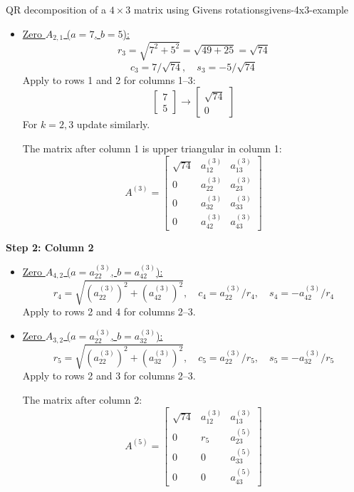 \begin{example}{QR decomposition of a $4\times3$ matrix using Givens rotations}{givens-4x3-example}
\begin{itemize}
        \item \underline{Zero $A_{2,1}$ ($a=7$, $b=5$):}
        \[
            r_3 = \sqrt{7^2 + 5^2} = \sqrt{49 + 25} = \sqrt{74}
        \]
        \[
            c_3 = 7/\sqrt{74}, \quad s_3 = -5/\sqrt{74}
        \]
        Apply to rows 1 and 2 for columns 1--3:
        \[
            \begin{bmatrix}
                7 \\
                5
            \end{bmatrix}
            \to
            \begin{bmatrix}
                \sqrt{74} \\
                0
            \end{bmatrix}
        \]
        For $k=2,3$ update similarly.

        The matrix after column 1 is upper triangular in column 1:
        \[
            A^{(3)} = \begin{bmatrix}
                \sqrt{74} & a_{12}^{(3)} & a_{13}^{(3)} \\
                0 & a_{22}^{(3)} & a_{23}^{(3)} \\
                0 & a_{32}^{(3)} & a_{33}^{(3)} \\
                0 & a_{42}^{(3)} & a_{43}^{(3)}
            \end{bmatrix}
        \]
    \end{itemize}

    \textbf{Step 2: Column 2}

    \begin{itemize}
        \item \underline{Zero $A_{4,2}$ ($a=a_{22}^{(3)}$, $b=a_{42}^{(3)}$):}
        \[
            r_4 = \sqrt{(a_{22}^{(3)})^2 + (a_{42}^{(3)})^2}, \quad c_4 = a_{22}^{(3)}/r_4, \quad s_4 = -a_{42}^{(3)}/r_4
        \]
        Apply to rows 2 and 4 for columns 2--3.

        \item \underline{Zero $A_{3,2}$ ($a=a_{22}^{(3)}$, $b=a_{32}^{(3)}$):}
        \[
            r_5 = \sqrt{(a_{22}^{(3)})^2 + (a_{32}^{(3)})^2}, \quad c_5 = a_{22}^{(3)}/r_5, \quad s_5 = -a_{32}^{(3)}/r_5
        \]
        Apply to rows 2 and 3 for columns 2--3.

        The matrix after column 2:
        \[
            A^{(5)} = \begin{bmatrix}
                \sqrt{74} & a_{12}^{(3)} & a_{13}^{(3)} \\
                0 & r_5 & a_{23}^{(5)} \\
                0 & 0 & a_{33}^{(5)} \\
                0 & 0 & a_{43}^{(5)}
            \end{bmatrix}
        \]
    \end{itemize}


\end{example}

